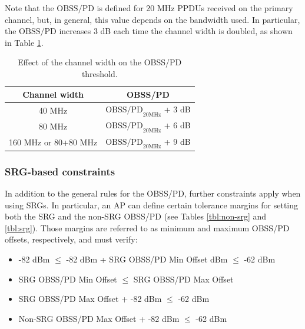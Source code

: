 \documentclass{ieeeaccess}
\begin{document}
Note that the $\text{OBSS/PD}$ is defined for 20 MHz PPDUs received on the primary channel, but, in general, this value depends on the bandwidth used. In particular, the $\text{OBSS/PD}$ increases 3 dB each time the channel width is doubled, as shown in Table \ref{tbl:sensitivity_channel_width}.
\begin{table}[ht!]
	\centering
	\begin{tabular}{|c|c|}
		\hline
		\textbf{Channel width} & \textbf{OBSS/PD} \\ \hline
		40 MHz & $\text{OBSS/PD}_{20 \text{MHz}}$ + 3 dB \\ \hline
		80 MHz & $\text{OBSS/PD}_{20 \text{MHz}}$ + 6 dB \\ \hline
		160 MHz or 80+80 MHz &  $\text{OBSS/PD}_{20 \text{MHz}}$ + 9 dB \\ \hline
	\end{tabular}
	\caption{Effect of the channel width on the OBSS/PD threshold.}
	\label{tbl:sensitivity_channel_width}
\end{table}

\subsubsection{SRG-based constraints}	
In addition to the general rules for the OBSS/PD, further constraints apply when using SRGs. In particular, an AP can define certain tolerance margins for setting both the SRG and the non-SRG OBSS/PD (see Tables \ref{tbl:non-srg} and \ref{tbl:srg}). Those margins are referred to as minimum and maximum OBSS/PD offsets, respectively, and must verify:
\begin{itemize}
	\item -82 dBm $\leq$ -82 dBm + SRG OBSS/PD Min Offset dBm $\leq$ -62 dBm 
	\item SRG OBSS/PD Min Offset $\leq$ SRG OBSS/PD Max Offset
	\item SRG OBSS/PD Max Offset + -82 dBm $\leq$ -62 dBm 
	\item Non-SRG OBSS/PD Max Offset + -82 dBm $\leq$  -62 dBm
\end{itemize}
\end{document}
